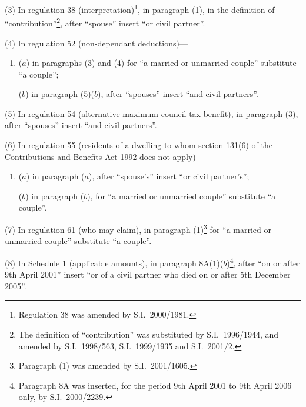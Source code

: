 \documentclass[12pt,a4paper]{article}
\begin{document}
(3) In regulation 38 (interpretation)\footnote{Regulation 38 was amended by S.I.\ 2000/1981.}, in paragraph (1), in the definition of “contribution”\footnote{The definition of “contribution” was substituted by S.I.\ 1996/1944, and amended by S.I.\ 1998/563, S.I.\ 1999/1935 and S.I.\ 2001/2.}, after “spouse” insert “or civil partner”.

(4) In regulation 52 (non-dependant deductions)—
\begin{enumerate}\item[]
($a$) in paragraphs (3) and (4) for “a married or unmarried couple” substitute “a couple”;

($b$) in paragraph (5)($b$), after “spouses” insert “and civil partners”.
\end{enumerate}

(5) In regulation 54 (alternative maximum council tax benefit), in paragraph (3), after “spouses” insert “and civil partners”.

(6) In regulation 55 (residents of a dwelling to whom section 131(6) of the Contributions and Benefits Act 1992 does not apply)—
\begin{enumerate}\item[]
($a$) in paragraph ($a$), after “spouse's” insert “or civil partner's”;

($b$) in paragraph ($b$), for “a married or unmarried couple” substitute “a couple”.
\end{enumerate}

(7) In regulation 61 (who may claim), in paragraph (1)\footnote{Paragraph (1) was amended by S.I.\ 2001/1605.} for “a married or unmarried couple” substitute “a couple”.

(8) In Schedule 1 (applicable amounts), in paragraph 8A(1)($b$)\footnote{Paragraph 8A was inserted, for the period 9th April 2001 to 9th April 2006 only, by S.I.\ 2000/2239.}, after “on or after 9th April 2001” insert “or of a civil partner who died on or after 5th December 2005”.
\end{document}
